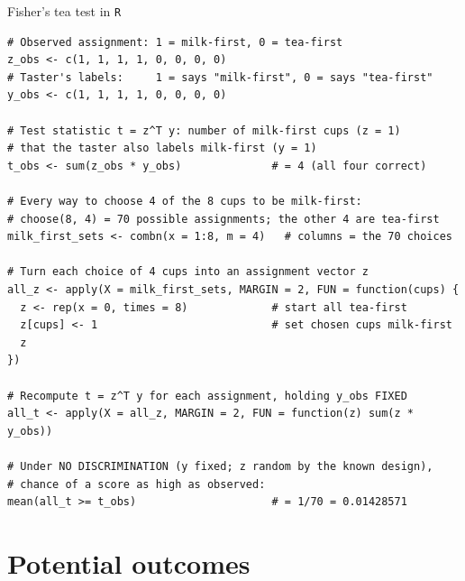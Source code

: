 \documentclass[table, xcolor = {dvipsnames}, 9pt]{beamer}
\theoremstyle{plain}
\begin{document}
\begin{frame}[fragile]{Fisher's tea test in \texttt{R}}
\begin{lstlisting}[style=Rstyle, basicstyle=\ttfamily\tiny, frame=single]
# Observed assignment: 1 = milk-first, 0 = tea-first
z_obs <- c(1, 1, 1, 1, 0, 0, 0, 0)
# Taster's labels:     1 = says "milk-first", 0 = says "tea-first"
y_obs <- c(1, 1, 1, 1, 0, 0, 0, 0)

# Test statistic t = z^T y: number of milk-first cups (z = 1)
# that the taster also labels milk-first (y = 1)
t_obs <- sum(z_obs * y_obs)              # = 4 (all four correct)

# Every way to choose 4 of the 8 cups to be milk-first:
# choose(8, 4) = 70 possible assignments; the other 4 are tea-first
milk_first_sets <- combn(x = 1:8, m = 4)   # columns = the 70 choices

# Turn each choice of 4 cups into an assignment vector z
all_z <- apply(X = milk_first_sets, MARGIN = 2, FUN = function(cups) {
  z <- rep(x = 0, times = 8)             # start all tea-first
  z[cups] <- 1                           # set chosen cups milk-first
  z
})

# Recompute t = z^T y for each assignment, holding y_obs FIXED
all_t <- apply(X = all_z, MARGIN = 2, FUN = function(z) sum(z * y_obs))

# Under NO DISCRIMINATION (y fixed; z random by the known design),
# chance of a score as high as observed:
mean(all_t >= t_obs)                     # = 1/70 = 0.01428571
\end{lstlisting}
\end{frame}
\section{Potential outcomes}
\end{document}
